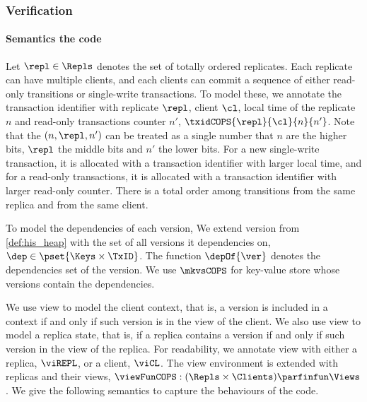 \subsubsection{Verification}
\paragraph{\bf Semantics the code}
Let \( \repl \in \Repls \) denotes the set of totally ordered replicates.
Each replicate can have multiple clients, and 
each clients can commit a sequence of either read-only transitions or single-write transactions.
To model these, we annotate the transaction identifier with replicate \( \repl \), client \( \cl \), 
local time of the replicate \( n \) and read-only transactions counter \( n' \), \ie \( \txidCOPS{\repl}{\cl}{n}{n'} \).
Note that the \( (n, \repl, n') \) can be treated as a single number that \( n \) are the higher bits, 
\( \repl \) the middle bits and \( n' \) the lower bits.
For a new single-write transaction, it is allocated with a transaction identifier with larger local time,
and for a read-only transactions, it is allocated with a transaction identifier with larger read-only counter.
There is a total order among transitions from the same replica and from the same client.

To model the dependencies of each version,
We extend version from \cref{def:his_heap} 
with the set of all versions it dependencies on, \( \dep \in \pset{\Keys \times \TxID} \).
The function \( \depOf{\ver} \) denotes the dependencies set of the version.
We use \( \mkvsCOPS \) for key-value store whose versions contain the dependencies.

We use view to model the client context,
that is, a version is included in a context if and only if such version is in the view of the client.
We also use view to model a replica state,
that is, if a replica contains a version if and only if such version in the view of the replica.
For readability, we annotate view with either a replica, \( \viREPL \), or a client, \( \viCL \).
The view environment is extended with replicas and their views, \( \viewFunCOPS : (\Repls \times \Clients ) \parfinfun \Views \).
We give the following semantics to capture the behaviours of the code.

